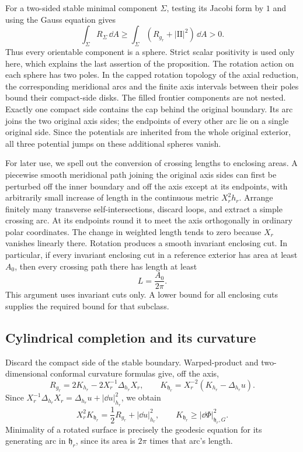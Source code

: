 For a two-sided stable minimal component $\Sigma$, testing its Jacobi
form by $1$ and using the Gauss equation gives
\begin{equation}\label{r:stable-sphere}
 \int_\Sigma R_\Sigma\,\dd A
 \ge \int_\Sigma(R_{g_r}+|\mathrm{II}|^2)\,\dd A>0.
\end{equation}
Thus every orientable component is a sphere.  Strict scalar positivity is
used only here, which explains the last assertion of the proposition.
The rotation action on each sphere has two poles.  In the capped rotation
topology of the axial reduction, the corresponding meridional arcs and
the finite axis intervals between their poles bound their compact-side
disks.  The filled frontier components are not nested.  Exactly one
compact side contains the cap behind the original boundary.  Its arc
joins the two original axis sides; the endpoints of every other arc lie
on a single original side.  Since the potentials are inherited from the
whole original exterior, all three potential jumps on these additional
spheres vanish.

For later use, we spell out the conversion of crossing lengths to
enclosing areas.  A piecewise smooth meridional path joining the original
axis sides can first be perturbed off the inner boundary and off the axis
except at its endpoints, with arbitrarily small increase of length in
the continuous metric $X_r^2h_r$.  Arrange finitely many transverse
self-intersections, discard loops, and extract a simple crossing arc.
At its endpoints round it to meet the axis orthogonally in ordinary polar
coordinates.  The change in weighted length tends to zero because $X_r$
vanishes linearly there.  Rotation produces a smooth invariant enclosing
cut.  In particular, if every invariant enclosing cut in a reference
exterior has area at least $A_0$, then every crossing path there has length
at least
\begin{equation}\label{r:area-length}
 L=\frac{A_0}{2\pi}.
\end{equation}
This argument uses invariant cuts only.  A lower bound for all enclosing
cuts supplies the required bound for that subclass.

\subsection{Cylindrical completion and its curvature}
\label{r:cylinders}

Discard the compact side of the stable boundary.  Warped-product and
two-dimensional conformal curvature formulas give, off the axis,
\[
 R_{g_r}=2K_{h_r}-2X_r^{-1}\Delta_{h_r}X_r,
 \qquad
 K_{\mathfrak h_r}=X_r^{-2}(K_{h_r}-\Delta_{h_r}u).
\]
Since $X_r^{-1}\Delta_{h_r}X_r=\Delta_{h_r}u+|\dd u|_{h_r}^2$,
we obtain
\begin{equation}\label{r:curvature}
 X_r^2K_{\mathfrak h_r}
 =\frac12R_{g_r}+|\dd u|_{h_r}^2,
 \qquad
 K_{\mathfrak h_r}\ge |\dd\Phi|_{\mathfrak h_r,G}^2.
\end{equation}
Minimality of a rotated surface is precisely the geodesic equation for
its generating arc in $\mathfrak h_r$, since its area is $2\pi$ times
that arc's length.

